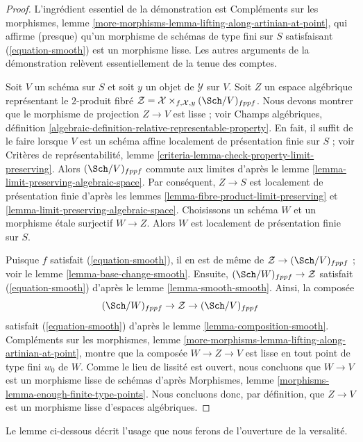 \begin{proof}
L'ingrédient essentiel de la démonstration est Compléments sur les morphismes,
lemme \ref{more-morphisms-lemma-lifting-along-artinian-at-point}, qui affirme
(presque) qu'un morphisme de schémas de type fini sur $S$ satisfaisant
(\ref{equation-smooth}) est un morphisme lisse. Les autres arguments de la
démonstration relèvent essentiellement de la tenue des comptes.

\medskip\noindent
Soit $V$ un schéma sur $S$ et soit $y$ un objet de $\mathcal{Y}$ sur $V$.
Soit $Z$ un espace algébrique représentant le $2$-produit fibré
$\mathcal{Z} = \mathcal{X} \times_{f, \mathcal{X}, y} (\Sch/V)_{fppf}$.
Nous devons montrer que le morphisme de projection $Z \to V$ est lisse ; voir
Champs algébriques, définition
\ref{algebraic-definition-relative-representable-property}. En fait, il
suffit de le faire lorsque $V$ est un schéma affine localement de présentation
finie sur $S$ ; voir Critères de représentabilité, lemme
\ref{criteria-lemma-check-property-limit-preserving}. Alors
$(\Sch/V)_{fppf}$ commute aux limites d'après le lemme
\ref{lemma-limit-preserving-algebraic-space}. Par conséquent, $Z \to S$ est
localement de présentation finie d'après les lemmes
\ref{lemma-fibre-product-limit-preserving} et
\ref{lemma-limit-preserving-algebraic-space}. Choisissons un schéma $W$ et un
morphisme étale surjectif $W \to Z$. Alors $W$ est localement de présentation
finie sur $S$.

\medskip\noindent
Puisque $f$ satisfait (\ref{equation-smooth}), il en est de même de
$\mathcal{Z} \to (\Sch/V)_{fppf}$ ; voir le lemme
\ref{lemma-base-change-smooth}. Ensuite,
$(\Sch/W)_{fppf} \to \mathcal{Z}$ satisfait (\ref{equation-smooth}) d'après le
lemme \ref{lemma-smooth-smooth}. Ainsi, la composée
$$
(\Sch/W)_{fppf} \to \mathcal{Z} \to (\Sch/V)_{fppf}
$$
satisfait (\ref{equation-smooth}) d'après le lemme
\ref{lemma-composition-smooth}. Compléments sur les morphismes, lemme
\ref{more-morphisms-lemma-lifting-along-artinian-at-point}, montre que la
composée $W \to Z \to V$ est lisse en tout point de type fini $w_0$ de $W$.
Comme le lieu de lissité est ouvert, nous concluons que $W \to V$ est un
morphisme lisse de schémas d'après Morphismes, lemme
\ref{morphisms-lemma-enough-finite-type-points}. Nous concluons donc, par
définition, que $Z \to V$ est un morphisme lisse d'espaces algébriques.
\end{proof}

\noindent
Le lemme ci-dessous décrit l'usage que nous ferons de l'ouverture de la
versalité.

